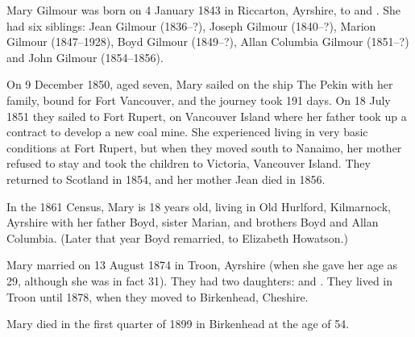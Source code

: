 
Mary Gilmour was born on 4 January 1843 in	Riccarton, Ayrshire, to  and .\cite{MGilmourBirth}
She had six siblings: Jean Gilmour (1836--?), Joseph Gilmour (1840--?),
Marion Gilmour (1847--1928), Boyd Gilmour (1849--?), Allan Columbia Gilmour (1851--?) and John Gilmour (1854--1856).

On 9 December 1850, aged seven,  Mary  sailed on the ship The Pekin with her family, bound for Fort Vancouver, and the journey took 191 days. On 18 July 1851 they sailed to Fort Rupert, on Vancouver Island where her father took up a contract to develop a new coal mine.  She experienced living in very basic conditions at Fort Rupert, but when they moved south to Nanaimo, her mother refused to stay and took the children to Victoria, Vancouver Island. They returned to Scotland in 1854, and her mother Jean died in 1856.

In the 1861 Census, Mary is 18 years old, living in Old Hurlford, Kilmarnock, Ayrshire  with her father Boyd, sister Marian, and brothers Boyd and Allan Columbia. (Later that year Boyd remarried, to Elizabeth Howatson.)

Mary  married  on 13 August 1874 in Troon, Ayrshire (when she gave her age as 29, although she was in fact 31).\cite{SMWC-MG-marriage}  They had two daughters:   and .
They lived in Troon until 1878, when they moved to Birkenhead, Cheshire.

Mary died in the first quarter of 1899 in Birkenhead at the age of 54. \cite{MGilmourDeath} 
